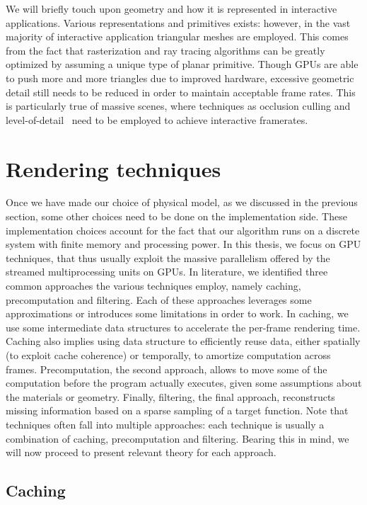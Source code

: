 We will briefly touch upon geometry and how it is represented in interactive applications. Various representations and primitives exists: however, in the vast majority of interactive application triangular meshes are employed. This comes from the fact that rasterization and ray tracing algorithms can be greatly optimized by assuming a unique type of planar primitive. Though GPUs are able to push more and more triangles due to improved hardware, excessive geometric detail still needs to be reduced in order to maintain acceptable frame rates. This is particularly true of massive scenes, where techniques as occlusion culling and level-of-detail~\cite{Clark1976} need to be employed to achieve interactive framerates. 

\section{Rendering techniques}
%
Once we have made our choice of physical model, as we discussed in the previous section,  some other choices need to be done on the implementation side. These implementation choices account for the fact that our algorithm runs on a discrete system with finite memory and processing power. In this thesis, we focus on GPU techniques, that thus usually exploit the massive parallelism offered by the streamed multiprocessing units on GPUs. In literature, we identified three common approaches the various techniques employ, namely caching, precomputation and filtering. Each of these approaches leverages some approximations or introduces some limitations in order to work. In caching, we use some intermediate data structures to accelerate the per-frame rendering time. Caching also implies using data structure to efficiently reuse data, either spatially (to exploit cache coherence) or temporally, to amortize computation across frames. Precomputation, the second approach, allows to move some of the computation before the program actually executes, given some assumptions about the materials or geometry. Finally, filtering, the final approach, reconstructs missing information based on a sparse sampling of a target function. Note that techniques often fall into multiple approaches: each technique is usually a combination of caching, precomputation and filtering. Bearing this in mind, we will now proceed to present relevant theory for each approach.

%
\subsection{Caching}

